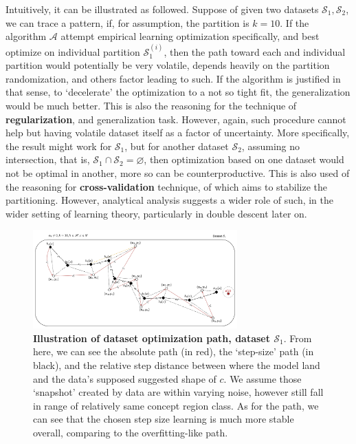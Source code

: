 \documentclass[twoside,10pt]{article}
\begin{document}
Intuitively, it can be illustrated as followed. Suppose of given two datasets $\mathcal{S}_{1},\mathcal{S}_{2}$, we can trace a pattern, if, for assumption, the partition is $k=10$. If the algorithm $\mathcal{A}$ attempt empirical learning optimization specifically, and best optimize on individual partition $\mathcal{S}_{1}^{(i)}$, then the path toward each and individual partition would potentially be very volatile, depends heavily on the partition randomization, and others factor leading to such. If the algorithm is justified in that sense, to `decelerate' the optimization to a not so tight fit, the generalization would be much better. This is also the reasoning for the technique of \textbf{regularization}, and generalization task. However, again, such procedure cannot help but having volatile dataset itself as a factor of uncertainty. More specifically, the result might work for $\mathcal{S}_{1}$, but for another dataset $\mathcal{S}_{2}$, assuming no intersection, that is, $\mathcal{S}_{1}\cap \mathcal{S}_{2}=\varnothing$, then optimization based on one dataset would not be optimal in another, more so can be counterproductive. This is also used of the reasoning for \textbf{cross-validation} technique, of which aims to stabilize the partitioning. However, analytical analysis suggests a wider role of such, in the wider setting of learning theory, particularly in double descent later on. 
\begin{figure}[htb]
  \centering
  \includegraphics[width=0.7\textwidth]{illustration_descent_algorithm1.png}
  \caption{\textbf{Illustration of dataset optimization path, dataset $\mathcal{S}_{1}$}. From here, we can see the absolute path (in red), the `step-size' path (in black), and the relative step distance between where the model land and the data's supposed suggested shape of $c$. We assume those `snapshot' created by data are within varying noise, however still fall in range of relatively same concept region class. As for the path, we can see that the chosen step size learning is much more stable overall, comparing to the overfitting-like path.}
  \label{fig:randomwalk_descent}
\end{figure}
\end{document}

